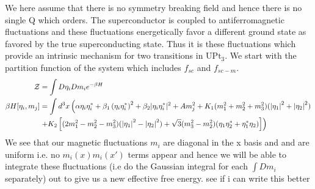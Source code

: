 \documentclass[prl,notitlepage,aps]{revtex4-1}
\begin{document}
We here assume that there is no symmetry breaking field and hence there is no single Q  which orders. The superconductor is coupled to antiferromagnetic fluctuations and these fluctuations energetically favor a different ground state as favored by the true superconducting state.  Thus it is these fluctuations which provide an intrinsic mechanism for two transitions in $\text{UPt}_3$. 
We start with the partition function of the system which includes $f_{sc}$ and $f_{sc-m}$. 
\begin{align}
\mathcal{Z} &= \int D\eta_i Dm_i  e^{-\beta H}\nonumber\\
\beta H[\eta_i,m_j] &= \int d^3x \left( \alpha\eta_i\eta_i^*+\beta_1\left(\eta_i\eta_i^*\right)^2+ \beta_2\lvert\eta_i\eta_i^*\rvert^2 + A m_j^2 + K_1(m_1^2+m_2^2+m_3^2)(\abs{\eta_1}^2+\abs{\eta_2}^2)\nonumber\right.\\ 
&\left.+ K_2 \left[(2m_1^2 - m_2^2-m_3^2)(\abs{\eta_1}^2-\abs{\eta_2}^2)+\sqrt{3}(m_3^2-m_2^2)(\eta_1\eta_2^*+\eta_1^*\eta_2)\right]\right)
\end{align}
We see that our magnetic fluctuations $m_i$ are diagonal in the x basis and and are uniform i.e. no $m_i(x)m_i(x')$ terms appear and hence we will be able to integrate these fluctuations (i.e do the Gaussian integral  for each $\int Dm_i$ separately) out to give us a new effective free energy. {\color{red} see if i can write this better} 
\end{document}

